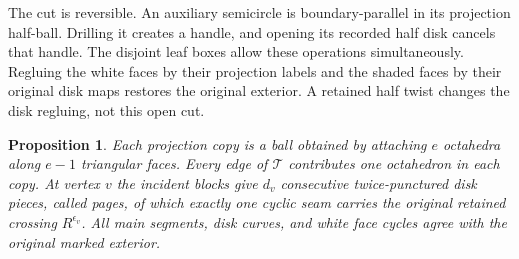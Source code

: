\documentclass[11pt]{article}
\numberwithin{equation}{section}
\newtheorem{proposition}[theorem]{Proposition}
\theoremstyle{definition}
\theoremstyle{remark}
\begin{document}
The cut is reversible. An auxiliary semicircle is boundary-parallel
in its projection half-ball. Drilling it creates a handle, and opening
its recorded half disk cancels that handle. The disjoint leaf boxes
allow these operations simultaneously. Regluing the white faces by
their projection labels and the shaded faces by their original disk
maps restores the original exterior. A retained half twist changes
the disk regluing, not this open cut.

\begin{proposition}\label{ctg:cut}
Each projection copy is a ball obtained by attaching $e$ octahedra
along $e-1$ triangular faces. Every edge of $\mathcal T$ contributes
one octahedron in each copy. At vertex $v$ the incident blocks give
$d_v$ consecutive twice-punctured disk pieces, called pages, of which exactly one cyclic seam
carries the original retained crossing $R^{\epsilon_v}$.
All main segments, disk curves, and white face cycles agree with
the original marked exterior.
\end{proposition}
\end{document}
